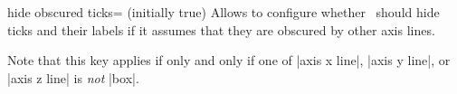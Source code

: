 \begin{pgfplotsxykey}{hide obscured \x\space ticks= (initially true)}
	Allows to configure whether \PGFPlots\ should hide ticks and their labels if it assumes that they are obscured by other axis lines.
\begin{codeexample}[]
\end{codeexample}
\begin{codeexample}[]
\end{codeexample}
	Note that this key applies if only and only if one of |axis x line|, |axis y line|, or |axis z line| is \emph{not} |box|.
\end{pgfplotsxykey}
